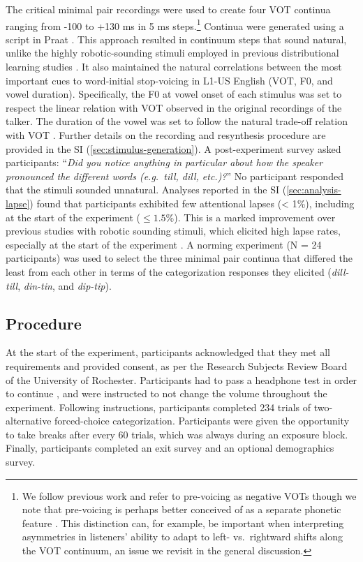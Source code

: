 \documentclass[
  11pt,
  man,mask,floatsintext]{apa6}
\begin{document}
The critical minimal pair recordings were used to create four VOT continua ranging from -100 to +130 ms in 5 ms steps.\footnote{We follow previous work \autocite{kleinschmidt2020,lisker-abramson1964} and refer to pre-voicing as negative VOTs though we note that pre-voicing is perhaps better conceived of as a separate phonetic feature \autocite[for discussion, see][]{mikuteit-reetz2007}. This distinction can, for example, be important when interpreting asymmetries in listeners' ability to adapt to left- vs.~rightward shifts along the VOT continuum, an issue we revisit in the general discussion.} Continua were generated using a script \autocite{winn2020} in Praat \autocite{boersma2022}. This approach resulted in continuum steps that sound natural, unlike the highly robotic-sounding stimuli employed in previous distributional learning studies \autocite[but see][]{theodore-monto2019}. It also maintained the natural correlations between the most important cues to word-initial stop-voicing in L1-US English (VOT, F0, and vowel duration). Specifically, the F0 at vowel onset of each stimulus was set to respect the linear relation with VOT observed in the original recordings of the talker. The duration of the vowel was set to follow the natural trade-off relation with VOT \autocite{allen-miller1999}. Further details on the recording and resynthesis procedure are provided in the SI (\ref{sec:stimulus-generation}). A post-experiment survey asked participants: ``\emph{Did you notice anything in particular about how the speaker pronounced the different words (e.g.~till, dill, etc.)?}'' No participant responded that the stimuli sounded unnatural. Analyses reported in the SI (\ref{sec:analysis-lapse}) found that participants exhibited few attentional lapses (\textless{} 1\%), including at the start of the experiment (\(\leq 1.5\)\%). This is a marked improvement over previous studies with robotic sounding stimuli, which elicited high lapse rates, especially at the start of the experiment \autocite[12\%,][]{kleinschmidt2020}. A norming experiment (N = 24 participants) was used to select the three minimal pair continua that differed the least from each other in terms of the categorization responses they elicited (\emph{dill-till}, \emph{din-tin}, and \emph{dip-tip}).

\subsection{Procedure}\label{sec:procedure}

At the start of the experiment, participants acknowledged that they met all requirements and provided consent, as per the Research Subjects Review Board of the University of Rochester. Participants had to pass a headphone test in order to continue \autocite{woods2017}, and were instructed to not change the volume throughout the experiment. Following instructions, participants completed 234 trials of two-alternative forced-choice categorization. Participants were given the opportunity to take breaks after every 60 trials, which was always during an exposure block. Finally, participants completed an exit survey and an optional demographics survey.
\end{document}
